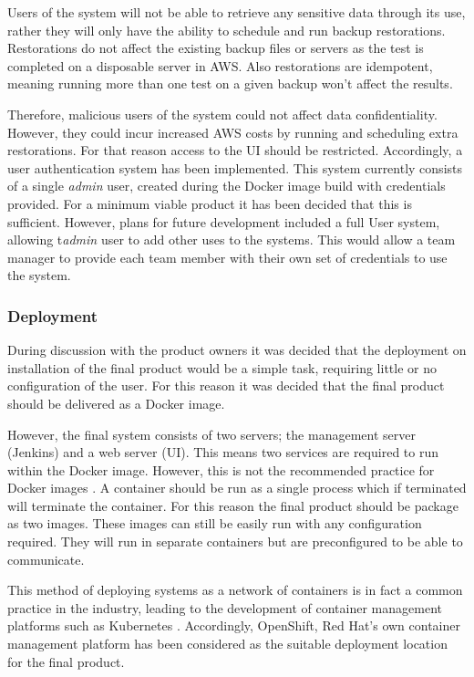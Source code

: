   Users of the system will not be able to retrieve any sensitive data through its use, rather they will only have the ability to schedule and run backup restorations. Restorations do not affect the existing backup files or servers as the test is completed on a disposable server in AWS. Also restorations are idempotent, meaning running more than one test on a given backup won't affect the results.
  
  Therefore, malicious users of the system could not affect data confidentiality. However, they could incur increased AWS costs by running and scheduling extra restorations. For that reason access to the UI should be restricted. Accordingly,  a user authentication system has been implemented. This system currently consists of a single \textit{admin} user, created during the Docker image build with credentials provided. For a minimum viable product it has been decided that this is sufficient. However, plans for future development included a full User system, allowing t\textit{admin} user to add other uses to the systems. This would allow a team manager to provide each team member with their own set of credentials to use the system.
  
  \subsubsection{Deployment}
  During discussion with the product owners it was decided that the deployment on installation of the final product would be a simple task, requiring little or no configuration of the user. For this reason it was decided that the final product should be delivered as a Docker image.
  
  However, the final system consists of two servers; the management server (Jenkins) and a web server (UI). This means two services are required to run within the Docker image. However, this is not the recommended practice for Docker images \citep{docker2}. A container should be run as a single process which if terminated will terminate the container. For this reason the final product should be package as two images. These images can still be easily run with any configuration required. They will run in separate containers but are preconfigured to be able to communicate.
  
  This method of deploying systems as a network of containers is in fact a common practice in the industry, leading to the development of container management platforms such as Kubernetes \citep{kubernetes}. Accordingly, OpenShift, Red Hat's own container management platform has been considered as the suitable deployment location for the final product.
  
